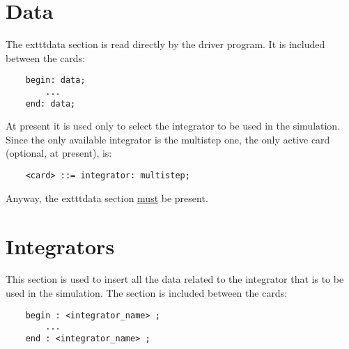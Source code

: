 %
%
%
%
%
% 
%
%

\chapter{Data}
The 	exttt{data} section is read directly by the driver program. It is
included between the cards:
\begin{verbatim}
    begin: data;
        ...
    end: data;
\end{verbatim}
At present it is used only to select the integrator to be used in the
simulation. 
Since the only available integrator is the multistep one, the only active 
card (optional, at present), is:
\begin{verbatim}
    <card> ::= integrator: multistep;
\end{verbatim}
Anyway, the 	exttt{data} section \underline{must} be present.





\chapter{Integrators}
This section is used to insert all the data related to the integrator that
is to be used in the simulation. The section is included between the cards:
\begin{verbatim}
    begin : <integrator_name> ;
        ...
    end : <integrator_name> ;
\end{verbatim}





